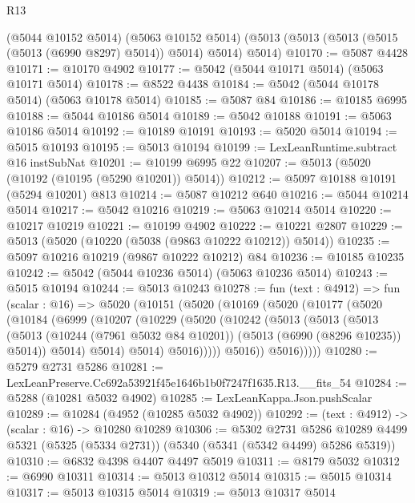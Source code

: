 \begin{lexlean}{R13}
\begin{coremodule}
    (@5044 @10152 @5014)
    (@5063 @10152 @5014)
    (@5013 (@5013 (@5013 (@5015 (@5013 (@6990 @8297) @5014)) @5014) @5014) @5014)
@10170 := @5087 @4428
@10171 := @10170 @4902
@10177 := @5042 (@5044 @10171 @5014) (@5063 @10171 @5014)
@10178 := @8522 @4438
@10184 := @5042 (@5044 @10178 @5014) (@5063 @10178 @5014)
@10185 := @5087 @84
@10186 := @10185 @6995
@10188 := @5044 @10186 @5014
@10189 := @5042 @10188
@10191 := @5063 @10186 @5014
@10192 := @10189 @10191
@10193 := @5020 @5014
@10194 := @5015 @10193
@10195 := @5013 @10194
@10199 := LexLeanRuntime.subtract @16 instSubNat
@10201 := @10199 @6995 @22
@10207 := @5013 (@5020 (@10192 (@10195 (@5290 @10201)) @5014))
@10212 := @5097 @10188 @10191 (@5294 @10201) @813
@10214 := @5087 @10212 @640
@10216 := @5044 @10214 @5014
@10217 := @5042 @10216
@10219 := @5063 @10214 @5014
@10220 := @10217 @10219
@10221 := @10199 @4902
@10222 := @10221 @2807
@10229 := @5013 (@5020 (@10220 (@5038 (@9863 @10222 @10212)) @5014))
@10235 := @5097 @10216 @10219 (@9867 @10222 @10212) @84
@10236 := @10185 @10235
@10242 := @5042 (@5044 @10236 @5014) (@5063 @10236 @5014)
@10243 := @5015 @10194
@10244 := @5013 @10243
@10278 := fun (text : @4912) =>
  fun (scalar : @16) =>
  @5020
    (@10151
      (@5020
        (@10169
          (@5020
            (@10177
              (@5020
                (@10184
                  (@6999
                    (@10207
                      (@10229
                        (@5020
                          (@10242
                            (@5013
                              (@5013
                                (@5013
                                  (@5013
                                    (@10244 (@7961 @5032 @84 @10201))
                                    (@5013 (@6990 (@8296 @10235)) @5014))
                                  @5014)
                                @5014)
                              @5014)
                            @5016)))))
                  @5016))
              @5016)))))
@10280 := @5279 @2731 @5286
@10281 := LexLeanPreserve.Cc692a53921f45e1646b1b0f7247f1635.R13.__fits_54
@10284 := @5288 (@10281 @5032 @4902)
@10285 := LexLeanKappa.Json.pushScalar
@10289 := @10284 (@4952 (@10285 @5032 @4902))
@10292 := (text : @4912) -> (scalar : @16) -> @10280 @10289
@10306 := @5302
    @2731
    @5286
    @10289
    @4499
    @5321
    (@5325 (@5334 @2731))
    (@5340 (@5341 (@5342 @4499) @5286 @5319))
@10310 := @6832 @4398 @4407 @4497 @5019
@10311 := @8179 @5032
@10312 := @6990 @10311
@10314 := @5013 @10312 @5014
@10315 := @5015 @10314
@10317 := @5013 @10315 @5014
@10319 := @5013 @10317 @5014

\end{coremodule}
\end{lexlean}

